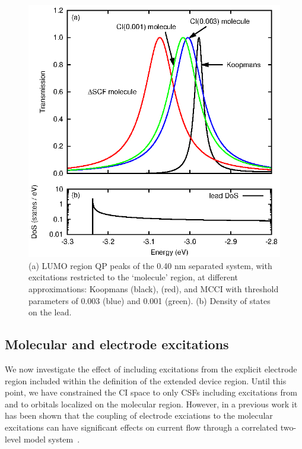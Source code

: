 \begin{figure}
	\begin{center}
		\includegraphics[width=0.9\linewidth]{figures/figure7a_7b}
	\end{center}
	\caption{(a) LUMO region \ac{QP} peaks of the 0.40 nm separated
	         system, with excitations restricted to the `molecule' region,
		 at different approximations: Koopmans (black),
		 \dscf (red), and MCCI with threshold parameters of
		 0.003 (blue) and 0.001 (green). (b) Density of states on the
		 lead.}
	\label{fig:all40Alumo}
\end{figure}

\subsection{Molecular and electrode excitations}
We now investigate the effect of including excitations from the
explicit electrode region included within the definition of the extended
device region. Until this point, we have constrained the CI space to only
\acp{CSF} including excitations from and to orbitals localized on the
molecular region. However, in a previous work it has been shown that the
coupling of electrode exciations to the molecular excitations can have
significant effects on current flow through a correlated two-level model
system~\cite{galperin_nitzan2006leadexcitations}. 

